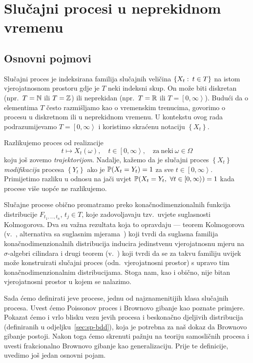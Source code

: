 \documentclass[main.tex]{subfiles}
\begin{document}
\nocite{*}

\chapter{Slučajni procesi u neprekidnom vremenu} \label{ch:sp}
\section{Osnovni pojmovi} \label{sec:sp-osnovni}
Slučajni proces je indeksirana familija slučajnih veličina \( \left\{ X_t \st t \in T \right\} \) na istom vjerojatnosnom prostoru
gdje je \( T \) neki indeksni skup. On može biti diskretan (npr.\ \( T = \N \) ili \( T = \Z \))
ili neprekidan (npr.\ \( T = \R \) ili \( T = \left[ 0, \infty \right\rangle  \)). Budući da o
elementima \( T \) često razmišljamo kao o vremenskim trenucima, govorimo o procesu u diskretnom
ili u neprekidnom vremenu.
U kontekstu ovog rada podrazumijevamo \( T = \left[ 0,\infty \right\rangle \) i koristimo skraćenu notaciju
\( \left\{ X_t \right\} \).

Razlikujemo proces od realizacije
\[ t \mapsto X_t(\omega), \quad t \in \left[ 0,\infty \right\rangle, \quad \mathrm{za \ neki} \ \omega \in \Omega \]
koju još zovemo \emph{trajektorijom}. Nadalje, kažemo da je slučajni proces \( \left\{ X_t \right\} \) \emph{modifikacija} procesa
\( \left\{ Y_t \right\} \) ako je \( \P(X_t = Y_t) = 1 \) za sve \( t \in \left[ 0,\infty \right\rangle \). Primijetimo razliku u odnosu
na jači uvjet \( \P(X_t = Y_t,\ \forall t \in \left[ 0,\infty \right\rangle) = 1 \) kada procese više uopće ne razlikujemo.

Slučajne procese obično promatramo preko konačnodimenzionalnih funkcija distribucije
\( F_{t_1, \ldots, t_n} \), \( t_j \in T \), koje zadovoljavaju tzv.\ uvjete suglasnosti Kolmogorova.
Dva su važna rezultata koja to opravdaju --- teorem Kolmogorova (v.~\cite[tm.~9.6]{sarapa}, alternativa sa suglasnim mjerama~\cite[tm.~1.8]{sato}) koji tvrdi
da suglasna familija konačnodimenzionalnih distribucija inducira je\-din\-stve\-nu vjerojatnosnu mjeru na \( \sigma \)-algebri cilindara
i drugi teorem (v.~\cite[tm.~9.7]{sarapa}) koji tvrdi da se za takvu familiju uvijek može konstruirati
slučajni proces (odn.\ vjerojatnosni prostor) s upravo tim konačnodimenzionalnim distribucijama. Stoga nam, kao i obično,
nije bitan vjerojatnosni prostor u kojem se nalazimo.

Sada ćemo definirati \levy jeve procese, jednu od najznamenitijih klasa slučajnih procesa. Uvest ćemo Poissonov proces
i Brownovo gibanje kao poznate primjere. Pokazat ćemo i vrlo blisku vezu \levy jevih procesa i beskonačno djeljivih distribucija (definiranih u odjeljku~\ref{sec:sp-bdd}), koja
je potrebna za naš dokaz da Brownovo gibanje postoji. Nakon toga ćemo skrenuti pažnju na teoriju samosličnih procesa i uvesti
frakcionalno Brownovo gibanje kao generalizaciju. Prije te definicije, uvedimo još jedan osnovni pojam.
\end{document}
